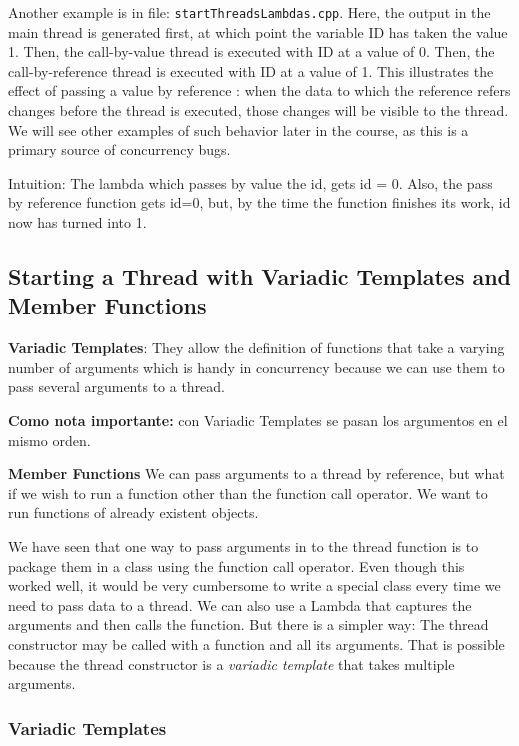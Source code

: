 \documentclass[11pt, a4paper]{article}
\begin{document}
Another example is in file: \texttt{startThreadsLambdas.cpp}. Here, the output in the main thread is generated first, at which point the variable ID has taken the value 1. Then, the call-by-value thread is executed with ID at a value of 0. Then, the call-by-reference thread is executed with ID at a value of 1. This illustrates the effect of passing a value by reference : when the data to which the reference refers changes before the thread is executed, those changes will be visible to the thread. We will see other examples of such behavior later in the course, as this is a primary source of concurrency bugs.


Intuition: The lambda which passes by value the id, gets id = 0. Also, the pass by reference function gets id=0, but, by the time the function finishes its work, id now has turned into 1.






\subsection{Starting a Thread with Variadic Templates and Member Functions}%
\label{sec:starting_a_thread_with_variadic_templates_and_member_functions}


\textbf{Variadic Templates}: They allow the definition of functions that take a varying number of arguments which is handy in concurrency because we can use them to pass several arguments to a thread. 

\textbf{Como nota importante:} con Variadic Templates se pasan los argumentos en el mismo orden.

\textbf{Member Functions} We can pass arguments to a thread by reference, but what if we wish to run a function other than the function call operator. We want to run functions of already existent objects. 



We have seen that one way to pass arguments in to the thread function is to package them in a class using the function call operator. Even though this worked well, it would be very cumbersome to write a special class every time we need to pass data to a thread. We can also use a Lambda that captures the arguments and then calls the function. But there is a simpler way: The thread constructor may be called with a function and all its arguments. That is possible because the thread constructor is a \textit{variadic template} that takes multiple arguments.


\subsubsection{Variadic Templates}%
\label{sub:variadic_templates}
\end{document}
